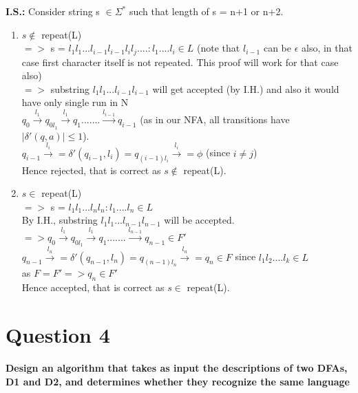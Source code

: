 \documentclass{article}
\begin{document}
\textbf{I.S.:} Consider string s $\in \Sigma^*$ such that length of s = n+1 or n+2.
    \begin{enumerate}
        \item  $s \notin $ repeat(L)\\
        $=> $ s = $l_1l_1...l_{i-1}l_{i-1}l_il_j.... : l_1....l_i \in L$ (note that $l_{i-1}$ can be $\epsilon$ also, in that case first character itself is not repeated. This proof will work for that 
        case also)\\
        $=> $ substring $l_1l_1...l_{i-1}l_{i-1} $ will get accepted (by I.H.) and also it would have only single run in N\\
        $q_0 \xrightarrow{l_1} q_{0l_1} \xrightarrow{l_1} q_1 ....... \xrightarrow{l_{i-1}} q_{i-1}$ (as in our NFA, all transitions have $|\delta'(q,a)| \leq 1$).\\
        $q_{i-1} \xrightarrow{l_i} = \delta'(q_{i-1},l_i) = q_{(i-1)l_i} \xrightarrow{l_i} = \phi$ (since $i \neq j$)\\
        Hence rejected, that is correct as $s \notin $ repeat(L).

        \item  $s \in $ repeat(L)\\
        $=> $ s = $l_1l_1...l_nl_n : l_1....l_n \in L$\\
        By I.H., substring $l_1l_1...l_{n-1}l_{n-1}$ will be accepted.\\
        $=> q_0 \xrightarrow{l_1} q_{0l_1} \xrightarrow{l_1} q_1 ....... \xrightarrow{l_{n-1}} q_{n-1} \in F'$ \\
        $q_{n-1} \xrightarrow{l_n} = \delta'(q_{n-1},l_n) = q_{(n-1)l_n} \xrightarrow{l_n} = q_n \in F $ since $l_1l_2....l_k \in L$\\
        as $F = F' => q_n \in F'$\\
        Hence accepted, that is correct as $s \in $ repeat(L).
    \end{enumerate}





\pagebreak
\section{Question 4}
\textbf{Design an algorithm that takes as input the descriptions of two DFAs, D1 and D2, and
determines whether they recognize the same language}\\
\end{document}
